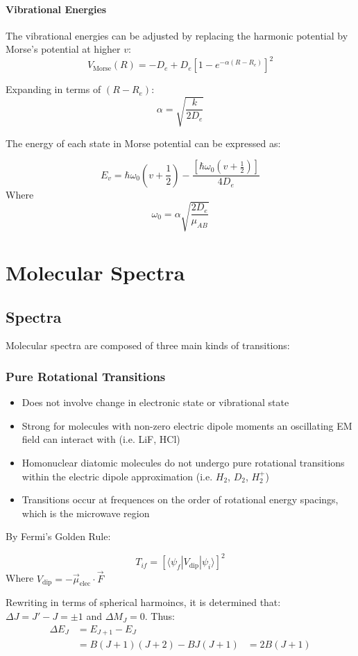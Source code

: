 \documentclass[12pt]{article}
\begin{document}
\paragraph{Vibrational Energies}
The vibrational energies can be adjusted by replacing the harmonic potential by Morse's potential at higher $v$:
\[ V_\text{Morse}(R) = -D_e + D_e[1-e^{-\alpha(R-R_e)}]^2\]

Expanding in terms of $(R-R_e)$:
\[ \alpha = \sqrt{\frac{k}{2D_e}}\]

The energy of each state in Morse potential can be expressed as:

\[E_v = \hbar \omega_0(v+\frac12) - \frac{[\hbar\omega_0(v+\frac12)]}{4D_e}\]
Where
\[\omega_0 = \alpha \sqrt{\frac{2D_e}{\mu_{AB}}}\]

\section{Molecular Spectra}

\subsection{Spectra}
Molecular spectra are composed of three main kinds of transitions:
\subsubsection{Pure Rotational Transitions}
    \begin{itemize}
        \item Does not involve change in electronic state or vibrational state
        \item Strong for molecules with non-zero electric dipole moments an oscillating EM field can interact with (i.e. LiF, HCl)
        \item Homonuclear diatomic molecules do not undergo pure rotational transitions within the electric dipole approximation (i.e. $H_2$, $D_2$, $H_2^+$)
        \item Transitions occur at frequences on the order of rotational energy spacings, which is the microwave region
    \end{itemize}
    
By Fermi's Golden Rule:

\[T_{if} = [\langle \psi_f|V_\text{dip}|\psi_i\rangle]^2\]
Where $V_\text{dip} = -\vec{\mu}_\text{elec} \cdot \vec{F}$

Rewriting in terms of spherical harmoincs, it is determined that: $\Delta J = J' - J = \pm 1$ and $\Delta M_J = 0$. Thus:
\begin{align*}
    \Delta E_J &= E_{J+1} -E_J\\
    &= B(J+1)(J+2) - BJ(J+1)
    &= 2B(J+1)
\end{align*}
\end{document}
